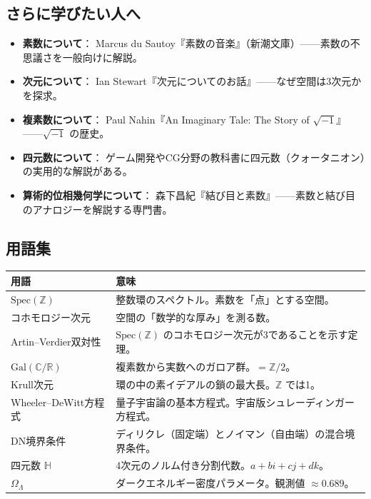 \documentclass[12pt,a4paper]{article}
\begin{document}
\subsection*{さらに学びたい人へ}

\begin{itemize}
  \item \textbf{素数について}：
    Marcus du Sautoy『素数の音楽』（新潮文庫）——素数の不思議さを一般向けに解説。
  \item \textbf{次元について}：
    Ian Stewart『次元についてのお話』——なぜ空間は3次元かを探求。
  \item \textbf{複素数について}：
    Paul Nahin『An Imaginary Tale: The Story of $\sqrt{-1}$』——$\sqrt{-1}$ の歴史。
  \item \textbf{四元数について}：
    ゲーム開発やCG分野の教科書に四元数（クォータニオン）の実用的な解説がある。
  \item \textbf{算術的位相幾何学について}：
    森下昌紀『結び目と素数』——素数と結び目のアナロジーを解説する専門書。
\end{itemize}

\subsection*{用語集}

\begin{center}
\renewcommand{\arraystretch}{1.3}
\begin{tabular}{p{4cm}p{8cm}}
\toprule
\textbf{用語} & \textbf{意味} \\
\midrule
$\mathrm{Spec}(\mathbb{Z})$ & 整数環のスペクトル。素数を「点」とする空間。 \\
コホモロジー次元 & 空間の「数学的な厚み」を測る数。 \\
Artin--Verdier双対性 & $\mathrm{Spec}(\mathbb{Z})$ のコホモロジー次元が3であることを示す定理。 \\
$\mathrm{Gal}(\mathbb{C}/\mathbb{R})$ & 複素数から実数へのガロア群。$= \mathbb{Z}/2$。 \\
Krull次元 & 環の中の素イデアルの鎖の最大長。$\mathbb{Z}$ では1。 \\
Wheeler--DeWitt方程式 & 量子宇宙論の基本方程式。宇宙版シュレーディンガー方程式。 \\
DN境界条件 & ディリクレ（固定端）とノイマン（自由端）の混合境界条件。 \\
四元数 $\mathbb{H}$ & 4次元のノルム付き分割代数。$a + bi + cj + dk$。 \\
$\Omega_\Lambda$ & ダークエネルギー密度パラメータ。観測値 $\approx 0.689$。 \\
\bottomrule
\end{tabular}
\end{center}
\end{document}
